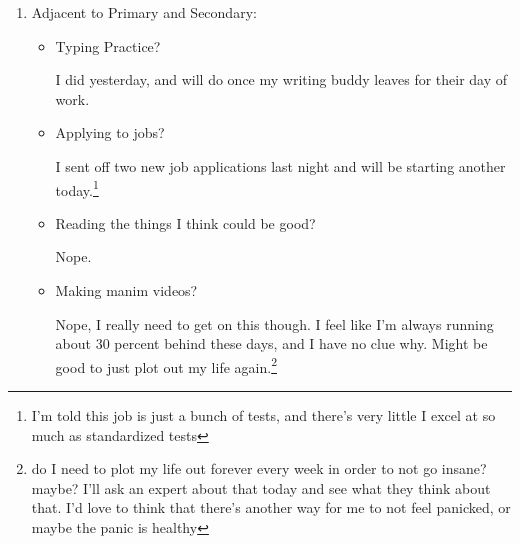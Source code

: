 \documentclass[12pt]{article}
\renewcommand{\,}{\textsuperscript{,}}
\begin{document}
\begin{enumerate}
\begin{itemize}
\begin{itemize}
\item Being open?

Generally! I like showing the real me, and I think that I'm getting comfortable with my habit of loose papers in the backpack.\footnote{this is not a non sequitor I promise. Recently someone expressed horror at my current organization strategy (many folders with hole punched loose leaf pages, each folder having a cover page and otherwise by and large being hand-written), to which a friend responded that my previous life organization was loose pages in my backpack.  
I didn't think that they were right, but everyone else in my life agreed, and I have been realizing that, while it's never my only method, it is one I always have.  
It's nice being able to not have to damage or destroy books (codexes, I guess (codicies?)), and people in my life need a single piece of scratch paper fairly often (wow this is such a long footnote)}

\item Being appropriately vulnerable?

Generally! I'm sharing the struggles I'm having with people.  
I'm shocked at how positive the response to my latest song is, because \textbf{I} thought that it was a cry for help, but.

\end{itemize}

\end{itemize}

\item Adjacent to Primary and Secondary:

\begin{itemize}

\item Typing Practice?

I did yesterday, and will do once my writing buddy leaves for their day of work.

\item Applying to jobs?

I sent off two new job applications last night and will be starting another today.\footnote{I'm told this job is just a bunch of tests, and there's very little I excel at so much as standardized tests}

\item Reading the things I think could be good?

Nope.

\item Making manim videos?

Nope, I really need to get on this though.  
I feel like I'm always running about 30 percent behind these days, and I have no clue why.  
Might be good to just plot out my life again.\footnote{do I need to plot my life out forever every week in order to not go insane? maybe?  
I'll ask an expert about that today and see what they think about that. I'd love to think that there's another way for me to not feel panicked, or maybe the panic is healthy}


\end{itemize}
\end{enumerate}
\end{document}
